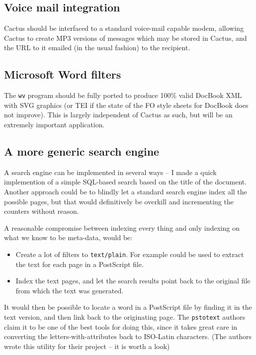 \subsection*{Voice mail integration}

Cactus should be interfaced to a standard voice-mail capable modem,
allowing Cactus to create MP3 versions of messages which may be stored
in Cactus, and the URL to it emailed (in the usual fashion) to the
recipient.


\subsection*{Microsoft Word filters}

The \texttt{wv} program should be fully ported to produce 100\% valid
DocBook XML with SVG graphics (or TEI if the state of the FO style
sheets for DocBook does not improve).  This is largely independent of
Cactus as such, but will be an extremely important application.


\subsection*{A more generic search engine}

A search engine can be implemented in several ways -- I made a quick
implemention of a simple SQL-based search based on the title of the
document.  Another approach could be to blindly let a standard search
engine index all the possible pages, but that would definitively be
overkill and incrementing the counters without reason.

A reasonable compromise between indexing every thing and only indexing
on what we know to be meta-data, would be:

\begin{itemize}
\item Create a lot of filters to \texttt{text/plain}.  For example
  could
  be used to extract the text for each page in a PostScript file.

\item
  Index the text pages, and let the search results point back to the
  original file from which the text was generated.
\end{itemize}

It would then be possible to locate a word in a PostScript file by
finding it in the text version, and then link back to the originating
page.  The \texttt{pstotext} authors claim it to be one of the best
tools for doing this, since it takes great care in converting the
letters-with-attributes back to ISO-Latin characters.  (The authors
wrote this utility for their
 project -- it is worth a look)


